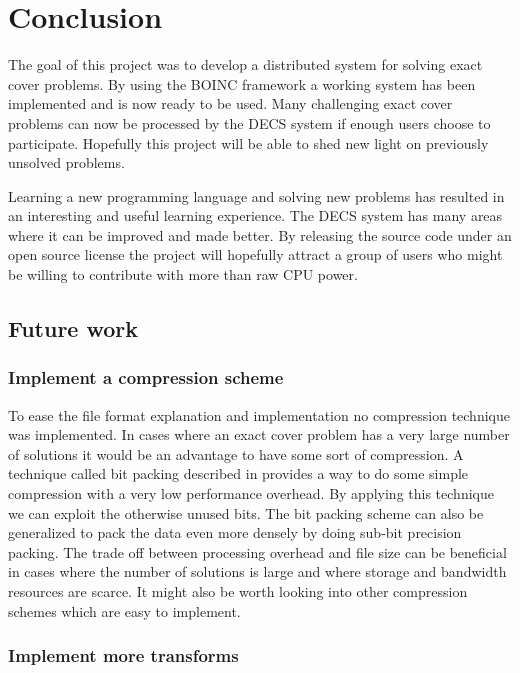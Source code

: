 
\chapter{Conclusion}
\label{conclusion}

The goal of this project was to develop a distributed system for solving exact cover problems.
By using the BOINC framework a working system has been implemented and is now ready to be used.
Many challenging exact cover problems can now be processed by the DECS system if enough users choose to participate.
Hopefully this project will be able to shed new light on previously unsolved problems.

Learning a new programming language and solving new problems has resulted in an interesting and useful learning experience.
The DECS system has many areas where it can be improved and made better.
By releasing the source code under an open source license the project will hopefully attract a group of users who might be willing to contribute with more than raw CPU power.



\section{Future work}

\subsection*{Implement a compression scheme}

To ease the file format explanation and implementation no compression technique was implemented.
In cases where an exact cover problem has a very large number of solutions it would be an advantage to have some sort of compression.
A technique called bit packing described in \cite{gdip_bitpack, gpg_bitpack} provides a way to do some simple compression with a very low performance overhead.
By applying this technique we can exploit the otherwise unused bits.
The bit packing scheme can also be generalized to pack the data even more densely by doing sub-bit precision packing.
The trade off between processing overhead and file size can be beneficial in cases where the number of solutions is large and where storage and bandwidth resources are scarce.
It might also be worth looking into other compression schemes which are easy to implement.


\subsection*{Implement more transforms}

